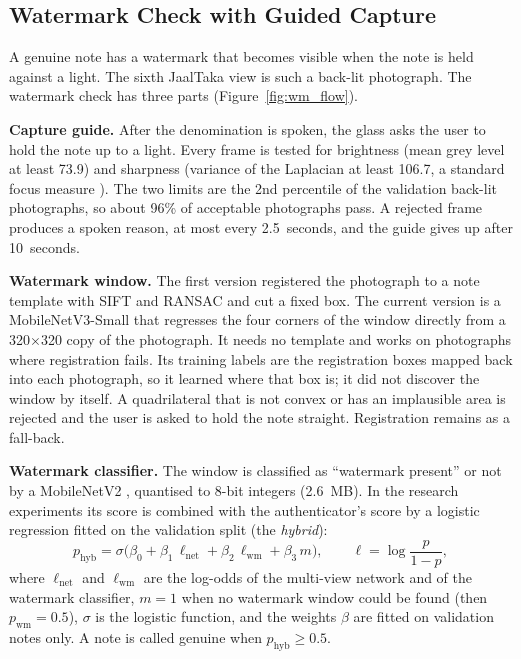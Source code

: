 \subsection{Watermark Check with Guided Capture}
\label{sec:watermark_method}
A genuine note has a watermark that becomes visible when the note is held against a light. The sixth JaalTaka view is such a back-lit photograph. The watermark check has three parts (Figure~\ref{fig:wm_flow}).

\textbf{Capture guide.} After the denomination is spoken, the glass asks the user to hold the note up to a light. Every frame is tested for brightness (mean grey level at least 73.9) and sharpness (variance of the Laplacian at least 106.7, a standard focus measure \cite{pechpacheco2000}). The two limits are the 2nd percentile of the validation back-lit photographs, so about 96\% of acceptable photographs pass. A rejected frame produces a spoken reason, at most every 2.5~seconds, and the guide gives up after 10~seconds.

\textbf{Watermark window.} The first version registered the photograph to a note template with SIFT and RANSAC and cut a fixed box. The current version is a MobileNetV3-Small \cite{mobilenetv3} that regresses the four corners of the window directly from a 320$\times$320 copy of the photograph. It needs no template and works on photographs where registration fails. Its training labels are the registration boxes mapped back into each photograph, so it learned where that box is; it did not discover the window by itself. A quadrilateral that is not convex or has an implausible area is rejected and the user is asked to hold the note straight. Registration remains as a fall-back.

\textbf{Watermark classifier.} The window is classified as ``watermark present'' or not by a MobileNetV2 \cite{mobilenetv2}, quantised to 8-bit integers (2.6~MB). In the research experiments its score is combined with the authenticator's score by a logistic regression fitted on the validation split (the \textit{hybrid}):
\begin{equation}
p_{\text{hyb}} = \sigma\!\big(\beta_0 + \beta_1\, \ell_{\text{net}} + \beta_2\, \ell_{\text{wm}} + \beta_3\, m\big),
\qquad \ell = \log\frac{p}{1-p},
\label{eq:hybrid}
\end{equation}
where $\ell_{\text{net}}$ and $\ell_{\text{wm}}$ are the log-odds of the multi-view network and of the watermark classifier, $m = 1$ when no watermark window could be found (then $p_{\text{wm}} = 0.5$), $\sigma$ is the logistic function, and the weights $\beta$ are fitted on validation notes only. A note is called genuine when $p_{\text{hyb}} \ge 0.5$.

